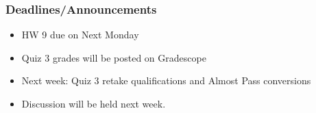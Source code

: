 \begin{frame}
    \frametitle{Deadlines/Announcements}
    \begin{itemize}
      \item HW 9 due on Next Monday
       \item Quiz 3 grades will be posted on Gradescope
       \item Next week: Quiz 3 retake qualifications and Almost Pass conversions
       \item Discussion will be held next week.
    \end{itemize}
\end{frame}

